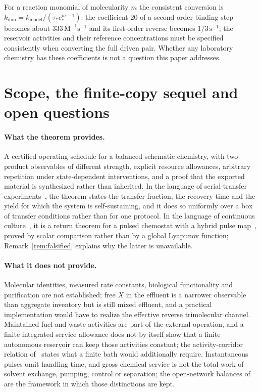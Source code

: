 \documentclass[11pt,a4paper]{article}
\theoremstyle{plain}
\theoremstyle{definition}
\theoremstyle{remark}
\begin{document}
For a reaction monomial of molecularity $m$ the consistent conversion is $k_{\mathrm{dim}}=k_{\mathrm{model}}/(\tau_*c_*^{m-1})$: the coefficient $20$ of a second-order binding step becomes about $333\,\mathrm{M^{-1}s^{-1}}$ and its first-order reverse becomes $1/3\,\mathrm{s^{-1}}$; the reservoir activities and their reference concentrations must be specified consistently when converting the full driven pair. Whether any laboratory chemistry has these coefficients is not a question this paper addresses.

\section{Scope, the finite-copy sequel and open questions}\label{sec:discussion}

\paragraph{What the theorem provides.}
A certified operating schedule for a balanced schematic chemistry, with two product observables of different strength, explicit resource allowances, arbitrary repetition under state-dependent interventions, and a proof that the exported material is synthesized rather than inherited. In the language of serial-transfer experiments~\citep{mills1967,lincoln2009}, the theorem states the transfer fraction, the recovery time and the yield for which the system is self-sustaining, and it does so uniformly over a box of transfer conditions rather than for one protocol. In the language of continuous culture~\citep{smithwaltman1995}, it is a return theorem for a pulsed chemostat with a hybrid pulse map~\citep{lakshmikantham1989}, proved by scalar comparison rather than by a global Lyapunov function; Remark~\ref{rem:falsified} explains why the latter is unavailable.

\paragraph{What it does not provide.}
Molecular identities, measured rate constants, biological functionality and purification are not established; free $X$ in the effluent is a narrower observable than aggregate inventory but is still mixed effluent, and a practical implementation would have to realize the effective reverse trimolecular channel. Maintained fuel and waste activities are part of the external operation, and a finite integrated service allowance does not by itself show that a finite autonomous reservoir can keep those activities constant; the activity-corridor relation of~\citep{thermo2026} states what a finite bath would additionally require. Instantaneous pulses omit handling time, and gross chemical service is not the total work of solvent exchange, pumping, control or separation; the open-network balances of~\citep{rao2016,polettini2014} are the framework in which those distinctions are kept.
\end{document}
